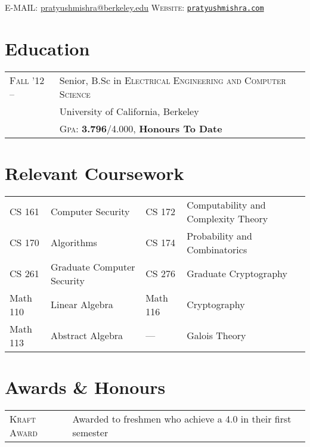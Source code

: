 \documentclass[10pt]{article}
\begin{document}
\pagestyle{empty} %

{\par}

\textsc{E-MAIL:} \href{mailto:pratyushmishra@berkeley.edu}{pratyushmishra@berkeley.edu}
\hfill
\textsc{Website:} \href{http://www.pratyushmishra.com}{\texttt{pratyushmishra.com}}

\section{Education}
\begin{tabular}{R{2.5cm}p{11cm}}

  \textsc{Fall '12 --} & Senior, B.Sc in \textsc{Electrical Engineering and Computer Science} \\
                       & University of California, Berkeley\\
                       & \textsc{Gpa:} \textbf{3.796}/4.000, \textbf{Honours To Date} \\
\end{tabular}
\section{Relevant Coursework}
\begin{tabular}{R{2.5cm}p{4.5cm}R{1.5cm}p{6cm}}

  CS 161   & Computer Security          & CS 172   & Computability and Complexity Theory\\
  CS 170   & Algorithms                 & CS 174   & Probability and Combinatorics\\
  CS 261   & Graduate Computer Security & CS 276   & Graduate Cryptography\\
  Math 110 & Linear Algebra             & Math 116 & Cryptography\\
  Math 113 & Abstract Algebra           & ---      & Galois Theory\\
\end{tabular}



\section{Awards \& Honours}
\begin{tabular}{R{2.5cm}p{11cm}}
  \textsc{Kraft Award} & Awarded to freshmen who achieve a 4.0 in their first semester\\
\end{tabular}
\end{document}
